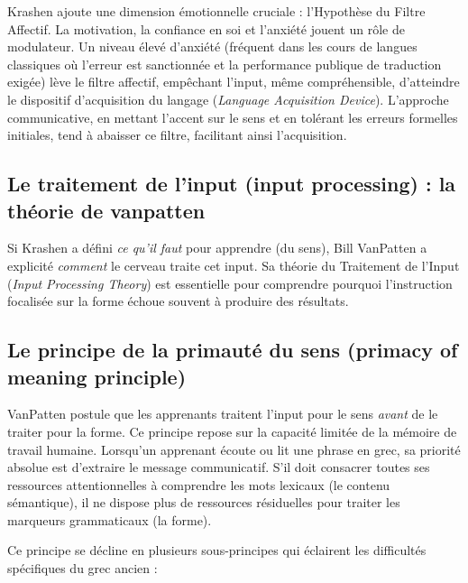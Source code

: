 Krashen ajoute une dimension émotionnelle cruciale : l'Hypothèse du Filtre Affectif. La motivation,
la confiance en soi et l'anxiété jouent un rôle de modulateur. Un niveau élevé d'anxiété (fréquent
dans les cours de langues classiques où l'erreur est sanctionnée et la performance publique de
traduction exigée) \og lève\fg{} le filtre affectif, empêchant l'input, même compréhensible,
d'atteindre le dispositif d'acquisition du langage (\textit{Language Acquisition
Device}).\cite{II-3-3-ref1} L'approche communicative, en mettant l'accent sur le sens et en tolérant
les erreurs formelles initiales, tend à abaisser ce filtre, facilitant ainsi
l'acquisition.\cite{II-3-3-ref2}



\subsection{Le traitement de l'input (input processing) : la théorie de vanpatten}

Si Krashen a défini \textit{ce qu'il faut} pour apprendre (du sens), Bill VanPatten a explicité
\textit{comment} le cerveau traite cet input. Sa théorie du Traitement de l'Input (\textit{Input
Processing Theory}) est essentielle pour comprendre pourquoi l'instruction focalisée sur la forme
échoue souvent à produire des résultats.



\subsection{Le principe de la primauté du sens (primacy of meaning principle)}

VanPatten postule que les apprenants traitent l'input pour le sens \textit{avant} de le traiter pour
la forme. Ce principe repose sur la capacité limitée de la mémoire de travail humaine. Lorsqu'un
apprenant écoute ou lit une phrase en grec, sa priorité absolue est d'extraire le message
communicatif. S'il doit consacrer toutes ses ressources attentionnelles à comprendre les mots
lexicaux (le contenu sémantique), il ne dispose plus de ressources résiduelles pour traiter les
marqueurs grammaticaux (la forme).\cite{II-3-3-ref6}

Ce principe se décline en plusieurs sous-principes qui éclairent les difficultés spécifiques du grec
ancien :

